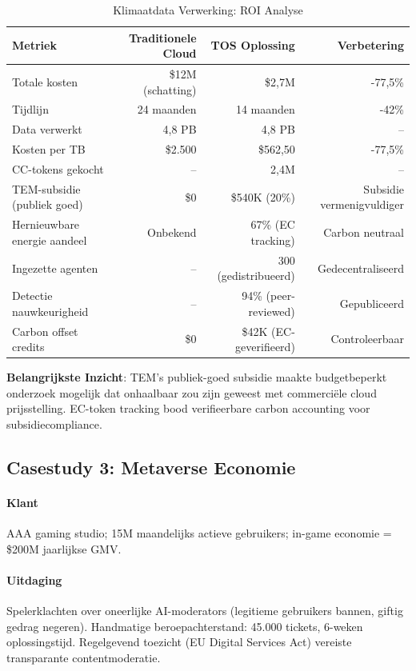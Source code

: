 \documentclass[11pt]{article}
\begin{document}
\begin{table}[H]
\centering
\caption{Klimaatdata Verwerking: ROI Analyse}
\label{tab:climate-roi}
\begin{tabular}{@{}lrrr@{}}
\toprule
\textbf{Metriek} & \textbf{Traditionele Cloud} & \textbf{TOS Oplossing} & \textbf{Verbetering} \\ \midrule
Totale kosten & \$12M (schatting) & \$2,7M & -77,5\% \\
Tijdlijn & 24 maanden & 14 maanden & -42\% \\
Data verwerkt & 4,8 PB & 4,8 PB & -- \\
Kosten per TB & \$2.500 & \$562,50 & -77,5\% \\
CC-tokens gekocht & -- & 2,4M & -- \\
TEM-subsidie (publiek goed) & \$0 & \$540K (20\%) & Subsidie vermenigvuldiger \\
Hernieuwbare energie aandeel & Onbekend & 67\% (EC tracking) & Carbon neutraal \\
Ingezette agenten & -- & 300 (gedistribueerd) & Gedecentraliseerd \\
Detectie nauwkeurigheid & -- & 94\% (peer-reviewed) & Gepubliceerd \\
Carbon offset credits & \$0 & \$42K (EC-geverifieerd) & Controleerbaar \\
\bottomrule
\end{tabular}
\end{table}

\textbf{Belangrijkste Inzicht}: TEM's publiek-goed subsidie maakte budgetbeperkt onderzoek mogelijk dat onhaalbaar zou zijn geweest met commerciële cloud prijsstelling. EC-token tracking bood verifieerbare carbon accounting voor subsidiecompliance.

\subsection{Casestudy 3: Metaverse Economie}

\paragraph{Klant} AAA gaming studio; 15M maandelijks actieve gebruikers; in-game economie = \$200M jaarlijkse GMV.

\paragraph{Uitdaging} Spelerklachten over oneerlijke AI-moderators (legitieme gebruikers bannen, giftig gedrag negeren). Handmatige beroepachterstand: 45.000 tickets, 6-weken oplossingstijd. Regelgevend toezicht (EU Digital Services Act) vereiste transparante contentmoderatie.
\end{document}
